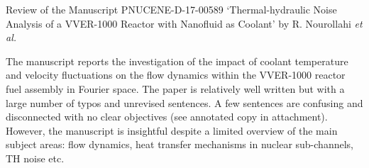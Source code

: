 \documentclass[14pt,twoside]{report}
\begin{document}
\afterpage{%
    \clearpage%
    \thispagestyle{empty}%
    \begin{landscape}%
        \centering %
        \vfill
    \end{landscape}
    \clearpage%
}
\vfill 
\clearpage



\begin{center}
  {\Large Review of the Manuscript PNUCENE-D-17-00589 `Thermal-hydraulic Noise Analysis of a VVER-1000 Reactor with Nanofluid as Coolant' by R. Nourollahi {\it et al.}}
\end{center}

\medskip
The manuscript reports the investigation of the impact of coolant temperature and velocity fluctuations on the flow dynamics within the VVER-1000 reactor fuel assembly in Fourier space. The paper is relatively well written but with a large number of typos and unrevised sentences. A few sentences are confusing and disconnected with no clear objectives (see annotated copy in attachment). However, the manuscript is insightful despite a limited overview of the main subject areas: flow dynamics, heat transfer mechanisms in nuclear sub-channels, TH noise etc.
\end{document}
